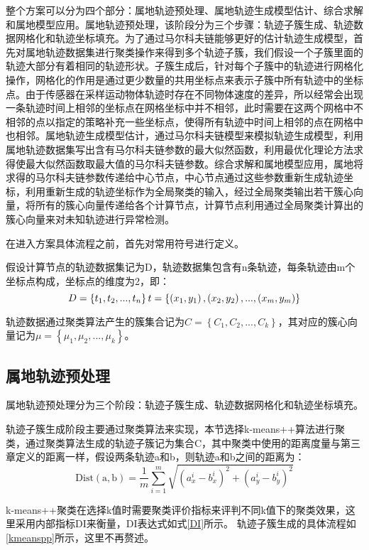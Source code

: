 整个方案可以分为四个部分：属地轨迹预处理、属地轨迹生成模型估计、综合求解和属地模型应用。属地轨迹预处理，该阶段分为三个步骤：轨迹子簇生成、轨迹数据网格化和轨迹坐标填充。为了通过马尔科夫链能够更好的估计轨迹生成模型，首先对属地轨迹数据集进行聚类操作来得到多个轨迹子簇，我们假设一个子簇里面的轨迹大部分有着相同的轨迹形状。子簇生成后，针对每个子簇中的轨迹进行网格化操作，网格化的作用是通过更少数量的共用坐标点来表示子簇中所有轨迹中的坐标点。由于传感器在采样运动物体轨迹时存在不同物体速度的差异，所以经常会出现一条轨迹时间上相邻的坐标点在网格坐标中并不相邻，此时需要在这两个网格中不相邻的点以指定的策略补充一些坐标点，使得所有轨迹中时间上相邻的点在网格中也相邻。属地轨迹生成模型估计，通过马尔科夫链模型来模拟轨迹生成模型，利用属地轨迹数据集写出含有马尔科夫链参数的最大似然函数，利用最优化理论方法求得使最大似然函数取最大值的马尔科夫链参数。综合求解和属地模型应用，属地将求得的马尔科夫链参数传递给中心节点，中心节点通过这些参数重新生成轨迹坐标，利用重新生成的轨迹坐标作为全局聚类的输入，经过全局聚类输出若干簇心向量，将所有的簇心向量传递给各个计算节点，计算节点利用通过全局聚类计算出的簇心向量来对未知轨迹进行异常检测。

在进入方案具体流程之前，首先对常用符号进行定义。

假设计算节点的轨迹数据集记为D，轨迹数据集包含有n条轨迹，每条轨迹由m个坐标点构成，坐标点的维度为2，即：
\[
D=\left\{ t_1,t_2,...,t_n \right\} 
\\
t=\left\{ \left( x_1,y_1 \right) ,\left( x_2,y_2 \right) ,...,\left( x_m,y_m \right) \right\} 
\]

轨迹数据通过聚类算法产生的簇集合记为$C=\left\{ C_1,C_2,...,C_k \right\} $，其对应的簇心向量记为$\mu =\left\{ \mu _1,\mu _2,...,\mu _k \right\} $。


\subsection{属地轨迹预处理}

属地轨迹预处理分为三个阶段：轨迹子簇生成、轨迹数据网格化和轨迹坐标填充。

轨迹子簇生成阶段主要通过聚类算法来实现，本节选择k-means++算法进行聚类，通过聚类算法生成的轨迹子簇记为集合C，其中聚类中使用的距离度量与第三章定义的距离一样，假设两条轨迹a和b，则轨迹a和b之间的距离为：
\[
\text{Dist}\left( \text{a},\text{b} \right) =\frac{1}{m}\sum_{i=1}^m{\sqrt{\left( a_{x}^{i}-b_{x}^{i} \right) ^2+\left( a_{y}^{i}-b_{y}^{i} \right) ^2}}
\]

k-means++聚类在选择k值时需要聚类评价指标来评判不同k值下的聚类效果，这里采用内部指标DI来衡量，DI表达式如式\ref{DI}所示。
轨迹子簇生成的具体流程如\ref{kmeanspp}所示，这里不再赘述。

